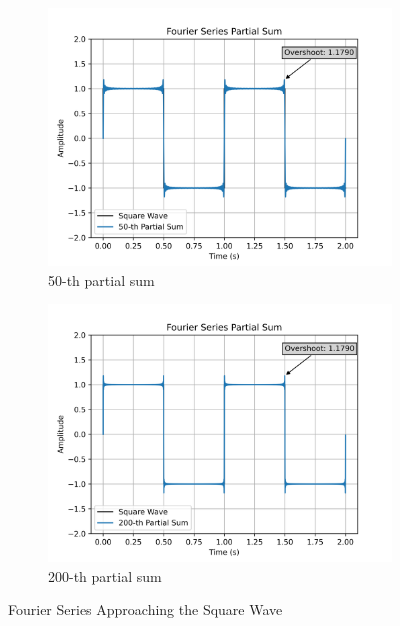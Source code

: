 \documentclass[12pt]{article}
\theoremstyle{definition}
\begin{document}
\begin{figure}[htbp]
    \begin{subfigure}[t]{0.45\textwidth}
        \centering
        \includegraphics[width=\textwidth]{50-partial.png}
        \caption{50-th partial sum}
        \label{fig:50-th partial sum}
    \end{subfigure}
    \quad
    \begin{subfigure}[t]{0.45\textwidth}
        \centering
        \includegraphics[width=\textwidth]{200-partial.png}
        \caption{200-th partial sum}
        \label{fig:200-th partial sum}
    \end{subfigure}

    \caption{Fourier Series Approaching the Square Wave}
    \label{fig:partial sums}
\end{figure}
\end{document}

